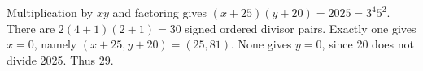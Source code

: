 Multiplication by $xy$ and factoring gives $(x+25)(y+20)=2025=3^4 5^2$. There are $2(4+1)(2+1)=30$ signed ordered divisor pairs. Exactly one gives $x=0$, namely $(x+25,y+20)=(25,81)$. None gives $y=0$, since 20 does not divide 2025. Thus $\boxed{29}$.
